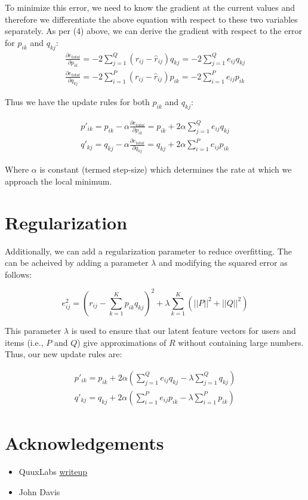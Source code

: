 \documentclass[12pt,reqno]{article}
\begin{document}
To minimize this error, we need to know the gradient at the current values and
therefore we differentiate the above equation with respect to these two
variables separately. As per (4) above, we can derive the gradient with respect
to the error for $p_{ik}$ and $q_{kj}$:
\begin{align}
  \frac{\partial e_{total}}{\partial p_{ik}} = -2\sum_{j=1}^{Q}(r_{ij} -
\hat{r}_{ij})q_{kj} = -2\sum_{j=1}^{Q}e_{ij}q_{kj} \\
  \frac{\partial e_{total}}{\partial q_{kj}} = -2\sum_{i=1}^{P}(r_{ij} -
\hat{r}_{ij})p_{ik} = -2\sum_{i=1}^{P}e_{ij}p_{ik}
\end{align}

Thus we have the update rules for both $p_{ik}$ and $q_{kj}$:

\begin{align}
  p'_{ik} = p_{ik} - \alpha\frac{\partial e_{total}}{\partial p_{ik}}
= p_{ik} + 2\alpha\sum_{j=1}^{Q}e_{ij}q_{kj} \\
  q'_{kj} = q_{kj} - \alpha\frac{\partial e_{total}}{\partial q_{kj}}
= q_{kj} + 2\alpha\sum_{i=1}^{P}e_{ij}p_{ik}
\end{align}

Where $\alpha$ is constant (termed step-size) which determines the rate at which
we approach the local minimum.

\section{Regularization}
Additionally, we can add a regularization parameter to reduce overfitting. The
can be acheived by adding a parameter $\lambda$ and modifying the squared error
as follows:

\begin{equation}
  e_{ij}^2 = (r_{ij} - \sum_{k=1}^{K}p_{ik} q_{kj})^2 + 
\lambda\sum_{k=1}^{K}(||P||^2 + ||Q||^2)
\end{equation}

This parameter $\lambda$ is used to ensure that our latent feature vectors for
users and items (i.e., $P$ and $Q$) give approximations of $R$ without
containing large numbers. Thus, our new update rules are:

\begin{align}
  p'_{ik} = p_{ik} + 2\alpha(\sum_{j=1}^{Q}e_{ij}q_{kj} -
\lambda\sum_{j=1}^{Q}q_{kj}) \\
  q'_{kj} = q_{kj} + 2\alpha(\sum_{i=1}^{P}e_{ij}p_{ik} -
\lambda\sum_{i=1}^{P}p_{ik})
\end{align}

\section{Acknowledgements}
\begin{itemize}
\item QuuxLabs \href{http://www.quuxlabs.com/blog/2010/09/matrix-factorization-a-simple-tutorial-and-implementation-in-python/}{writeup}
\item John Davis
\end{itemize}
\end{document}
